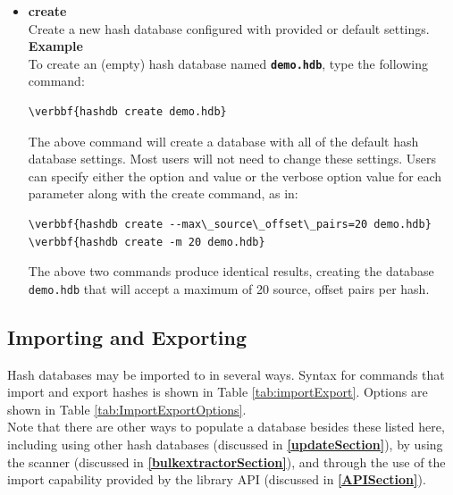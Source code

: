\documentclass[11pt,fleqn]{article} %
\begin{document}
\begin{itemize}
\item \textbf{create}\\
Create a new hash database configured with provided or default settings.\\

\textbf{Example}\\
To create an (empty) hash database named \textbf{\texttt{demo.hdb}}, type the following command:
\begin{Verbatim}[commandchars=\\\{\}]
\verbbf{hashdb create demo.hdb}
\end{Verbatim}
The above command will create a database with all of the default hash database settings. Most users will not need to change these settings.
Users can specify either the option and value or the verbose option value for each parameter along with the create command, as in:\\
\begin{Verbatim}[commandchars=\\\{\}]
\verbbf{hashdb create --max\_source\_offset\_pairs=20 demo.hdb}
\verbbf{hashdb create -m 20 demo.hdb}
\end{Verbatim}
The above two commands produce identical results, creating the database \texttt{demo.hdb} that will accept a maximum of 20 source, offset pairs per hash.\\
\end{itemize}

\subsection{Importing and Exporting}
Hash databases may be imported to in several ways.  Syntax for commands that import and export hashes is shown in Table \ref{tab:importExport}. Options are shown in Table \ref{tab:ImportExportOptions}.\\

Note that there are other ways to populate a database besides these listed here, including using other hash databases (discussed in \textbf{\autoref{updateSection}}),
by using the \bulk \hdb scanner (discussed in \textbf{\autoref{bulkextractorSection}}),
and through the use of the import capability provided by the \hdb library API (discussed in \textbf{\autoref{APISection}}).\\
\end{document}
